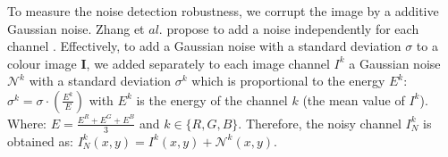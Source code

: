 \documentclass[twoside]{article}
\newcommand\noise{\mathcal{N}} %
\begin{document}
%
%	
To measure the noise detection robustness, we corrupt the image by a additive Gaussian noise. Zhang et $al.$ propose to add a noise independently for each channel \cite{zhang_ip_2007}. Effectively, to add a Gaussian noise with a standard deviation $\sigma$ to a colour image $\textbf{I}$, we added separately to each image channel $I^k$ a Gaussian noise $\noise^k$ with a standard deviation $\sigma^k$ which is proportional to the energy $E^k$: $\sigma^k =\sigma \cdot \left(\frac{E^k}{E}\right)$ with $E^k$ is the energy of the channel $k$ (the mean value of $I^k$). Where: $E=\frac{E^R + E^G + E^B}{3}$ and $k\in\{R,G,B\}$. Therefore, the noisy channel $I^k_N$ is obtained as: $I^k_N(x,y)= I^k(x,y) + \noise^k(x,y)$.    



%
%







%  
%
\end{document}
